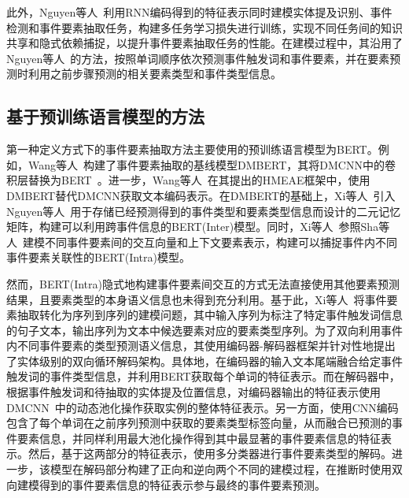 此外，Nguyen等人~\cite{nguyen2019one}利用RNN编码得到的特征表示同时建模实体提及识别、事件检测和事件要素抽取任务，构建多任务学习损失进行训练，实现不同任务间的知识共享和隐式依赖捕捉，以提升事件要素抽取任务的性能。在建模过程中，其沿用了Nguyen等人~\cite{nguyen2016joint}的方法，按照单词顺序依次预测事件触发词和事件要素，并在要素预测时利用之前步骤预测的相关要素类型和事件类型信息。


\subsection{基于预训练语言模型的方法}

第一种定义方式下的事件要素抽取方法主要使用的预训练语言模型为BERT。例如，Wang等人~\cite{wang2019hmeae}构建了事件要素抽取的基线模型DMBERT，其将DMCNN中的卷积层替换为BERT~\cite{devlin2019bert}。进一步，Wang等人~\cite{wang2019hmeae}在其提出的HMEAE框架中，使用DMBERT替代DMCNN获取文本编码表示。在DMBERT的基础上，Xi等人~\cite{xiangyu2021capturing}引入Nguyen等人~\cite{nguyen2016joint}用于存储已经预测得到的事件类型和要素类型信息而设计的二元记忆矩阵，构建可以利用跨事件信息的BERT(Inter)模型。同时，Xi等人~\cite{xiangyu2021capturing}参照Sha等人~\cite{sha2018jointly}建模不同事件要素间的交互向量和上下文要素表示，构建可以捕捉事件内不同事件要素关联性的BERT(Intra)模型。

然而，BERT(Intra)隐式地构建事件要素间交互的方式无法直接使用其他要素预测结果，且要素类型的本身语义信息也未得到充分利用。基于此，Xi等人~\cite{xiangyu2021capturing}将事件要素抽取转化为序列到序列的建模问题，其中输入序列为标注了特定事件触发词信息的句子文本，输出序列为文本中候选要素对应的要素类型序列。为了双向利用事件内不同事件要素的类型预测语义信息，其使用编码器-解码器框架并针对性地提出了实体级别的双向循环解码架构。具体地，在编码器的输入文本尾端融合给定事件触发词的事件类型信息，并利用BERT获取每个单词的特征表示。而在解码器中，根据事件触发词和待抽取的实体提及位置信息，对编码器输出的特征表示使用DMCNN~\cite{chen2015event}中的动态池化操作获取实例的整体特征表示。另一方面，使用CNN编码包含了每个单词在之前序列预测中获取的要素类型标签向量，从而融合已预测的事件要素信息，并同样利用最大池化操作得到其中最显著的事件要素信息的特征表示。然后，基于这两部分的特征表示，使用多分类器进行事件要素类型的解码。进一步，该模型在解码部分构建了正向和逆向两个不同的建模过程，在推断时使用双向建模得到的事件要素信息的特征表示参与最终的事件要素预测。

